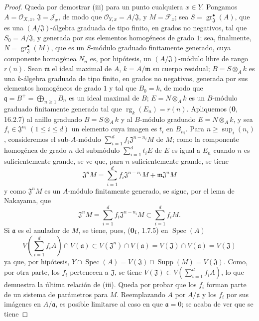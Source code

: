 \begin{proof}
Queda por demostrar (iii) para un punto cualquiera $x\in Y$. Pongamos
$A=\mathcal O_{X,x}$, $\mathfrak J=\mathcal J_x$, de modo que
$\mathcal O_{Y,x}=A/\mathfrak J$, y $M=\mathcal F_x$; sea
$S=\operatorname{gr}_{\mathfrak J}^{\bullet}(A)$, que es una
$(A/\mathfrak J)$-álgebra graduada de tipo finito, en grados no negativos, tal
que $S_0=A/\mathfrak J$, y generada por sus elementos homogéneos de grado
$1$; sea, finalmente,
$N=\operatorname{gr}_{\mathfrak J}^{\bullet}(M)$, que es un $S$-módulo
graduado finitamente generado, cuya componente homogénea $N_n$ es, por hipótesis,
un $(A/\mathfrak J)$-módulo libre de rango $r(n)$. Sean $\mathfrak m$
el ideal maximal de $A$, $k=A/\mathfrak m$ su cuerpo residual;
$B=S\otimes_A k$ es una $k$-álgebra graduada de tipo finito, en grados
no negativos, generada por sus elementos homogéneos de grado $1$ y tal que
$B_0=k$, de modo que $\mathfrak q=B^+=\bigoplus_{n\geq1}B_n$ es un ideal
maximal de $B$; $E=N\otimes_A k$ es un $B$-módulo graduado finitamente generado
tal que $\operatorname{rg}_k(E_n)=r(n)$. Apliquemos (\textbf 0, 16.2.7) al anillo
graduado $B=S\otimes_A k$ y al $B$-módulo graduado $E=N\otimes_A k$, y sea
$f_i\in\mathfrak J^{n_i}$ $(1\leq i\leq d)$ un elemento cuya imagen es $t_i$
en $B_{n_i}$. Para $n\geq\sup_i(n_i)$, consideremos el sub-$A$-módulo
$\sum_{i=1}^{d}f_i\mathfrak J^{n-n_i}M$ de $M$; como la componente homogénea
de grado $n$ del submódulo $\sum_{i=1}^{d}t_iE$ de $E$ es igual a
$E_n$ cuando $n$ es suficientemente grande, se ve que, para $n$ suficientemente grande, se tiene
\[
\mathfrak J^nM=\sum_{i=1}^{d}f_i\mathfrak J^{n-n_i}M+
\mathfrak m\mathfrak J^nM
\]
y como $\mathfrak J^nM$ es un $A$-módulo finitamente generado, se sigue,
por el lema de Nakayama, que
\[
\mathfrak J^nM=\sum_{i=1}^{d}f_i\mathfrak J^{n-n_i}M
\subset\sum_{i=1}^{d}f_iM.
\]
Si $\mathfrak a$ es el anulador de $M$, se tiene, pues, (\textbf{0}$_{\rm I}$, 1.7.5)
en $\operatorname{Spec}(A)$
\[
V\left(\sum_{i=1}^{d}f_iA\right)\cap V(\mathfrak a)
\subset V(\mathfrak J^n)\cap V(\mathfrak a)
=V(\mathfrak J)\cap V(\mathfrak a)=V(\mathfrak J)
\]
ya que, por hipótesis,
$Y\cap\operatorname{Spec}(A)=V(\mathfrak J)\cap\operatorname{Supp}(M)
=V(\mathfrak J)$. Como, por otra parte, los $f_i$ pertenecen a
$\mathfrak J$, se tiene
$V(\mathfrak J)\subset V(\sum_{i=1}^{d}f_iA)$, lo que demuestra la última
relación de (iii). Queda por probar que los $f_i$ forman parte de un sistema
de parámetros para $M$. Reemplazando $A$ por $A/\mathfrak a$ y los $f_i$ por
sus imágenes en $A/\mathfrak a$, es posible limitarse al caso en que
$\mathfrak a=0$; se acaba de ver que se tiene

\end{proof}
